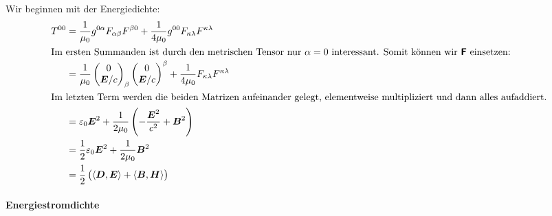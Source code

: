 Wir beginnen mit der Energiedichte:
\begin{align*}
	T^{00}
	&= \frac1{\mu_0} g^{0\alpha} F_{\alpha\beta} F^{\beta0} + \frac1{4\mu_0} g^{00} F_{\kappa\lambda} F^{\kappa\lambda} \\
	\intertext{%
		Im ersten Summanden ist durch den metrischen Tensor nur $\alpha = 0$
		interessant. Somit können wir $\tens F$ einsetzen:
	}
	&= \frac1{\mu_0}
	\begin{pmatrix}
		0 \\ \vec E / c
	\end{pmatrix}
	_\beta
	\begin{pmatrix}
		0 \\ \vec E / c
	\end{pmatrix}
	^\beta
	+ \frac1{4\mu_0} F_{\kappa\lambda} F^{\kappa\lambda} \\
	\intertext{%
		Im letzten Term werden die beiden Matrizen aufeinander gelegt,
		elementweise multipliziert und dann alles aufaddiert.
	}
	&= \varepsilon_0 \vec E^2 + \frac1{2\mu_0} \del{- \frac{\vec E^2}{c^2} + \vec B^2} \\
	&= \half \varepsilon_0 \vec E^2 + \frac1{2\mu_0} \vec B^2 \\
	&= \half \del{\inner{\vec D}{\vec E} + \inner{\vec B}{\vec H}}
\end{align*}

\paragraph{Energiestromdichte}

